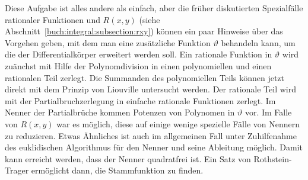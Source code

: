 Diese Aufgabe ist alles andere als einfach, aber die früher diskutierten
Spezialfälle rationaler Funktionen und $R(x,y)$
(siehe Abschnitt~\ref{buch:integral:subsection:rxy}) können ein paar
Hinweise über das Vorgehen geben, mit dem man eine zusätzliche
Funktion $\vartheta$ behandeln kann, um die der Differentialkörper
erweitert werden soll.
Ein rationale Funktion in $\vartheta$ wird zuänchst mit Hilfe der
Polynomdivision in einen polynomiellen und einen rationalen
Teil zerlegt.
Die Summanden des polynomiellen Teils können jetzt direkt mit
dem Prinzip von Liouville untersucht werden.
Der rationale Teil wird mit der Partialbruchzerlegung in
einfache rationale Funktionen zerlegt.
Im Nenner der Partialbrüche kommen Potenzen von Polynomen in $\vartheta$
vor. 
Im Falle von $R(x,y)$ war es möglich, diese auf einige wenige spezielle
Fälle von Nennern zu reduzieren.
Etwas Ähnliches ist auch im allgemeinen Fall unter Zuhilfenahme
des euklidischen Algorithmus für den Nenner und seine Ableitung möglich.
Damit kann erreicht werden, dass der Nenner quadratfrei ist.
Ein Satz von Rothstein-Trager ermöglicht dann, die Stammfunktion zu finden.

